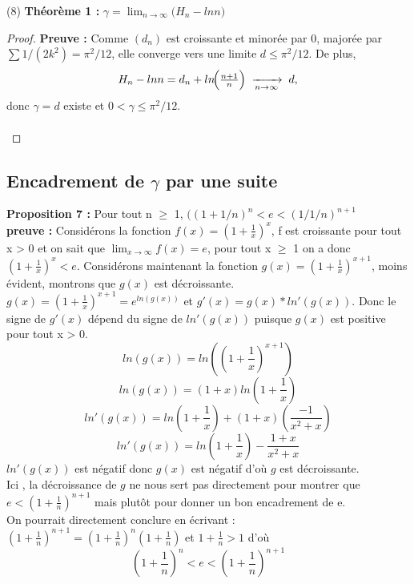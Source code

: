 \documentclass[a4paper,12pt]{article}
\begin{document}
(8) \textbf{Théorème 1 :} $\gamma = \lim_{n\to\infty}\bigl(H_n-ln n\bigr)$ \\

\begin{proof}
\textbf{Preuve : }
Comme \((d_n)\) est croissante et minorée par \(0\), majorée par \(\sum1/(2k^2)=\pi^2/12\), elle converge vers une limite \(d\le\pi^2/12\).  
De plus,
\[
H_n-ln n = d_n + ln\!\Bigl(\tfrac{n+1}{n}\Bigr)
\;\xrightarrow[n\to\infty]{}\;d,
\]
donc \(\gamma=d\) existe et \(0<\gamma\le\pi^2/12\). \\\\
\end{proof}



\color{black}

\subsection{Encadrement de \(\gamma\) par une suite}

\textbf{Proposition 7 : } Pour tout n $\ge$ 1, \(((1+1/n)^{n} < e < (1/1/n)^{n+1}\)\\

\textbf{preuve : }Considérons la fonction \(f(x) = (1+\frac{1}{x})^{x}\), f est croissante  pour tout x > 0 et on sait que \(\lim_{x \to \infty}f(x) = e\), pour tout x $\ge$ 1 on a donc \( (1+\frac{1}{x})^{x} < e\).
Considérons maintenant la fonction \(g(x) = (1 + \frac{1}{x})^{x+1}\), moins évident, montrons que \(g(x)\) est décroissante. 
\(g(x) = (1 + \frac{1}{x})^{x+1} = e^{ln(g(x))} \) et \(g'(x) = g(x) * ln'(g(x))\). Donc le signe de \(g'(x)\) dépend du signe de \(ln'(g(x))\) puisque \(g(x)\) est positive pour tout x > 0.
\[ ln(g(x)) = ln((1+\frac{1}{x})^{x+1})\]
\[ ln(g(x)) = (1+x)ln(1+\frac{1}{x})\]
\[ ln'(g(x)) = ln(1+\frac{1}{x}) + (1+x)(\frac{-1}{x^{2}+x})\]
\[ ln'(g(x)) = ln(1+\frac{1}{x}) - \frac{1+x}{x^{2}+x}\]
\(ln'(g(x))\) est négatif donc \(g(x)\) est négatif d'où \(g\) est décroissante.  \\
Ici , la décroissance de \(g\) ne nous sert pas directement pour montrer que \(e < (1 + \frac{1}{n})^{n+1}\) mais plutôt pour donner un bon encadrement de e.\\ 
On pourrait directement conclure en écrivant :\((1 + \frac{1}{n})^{n+1} = (1 + \frac{1}{n})^{n} (1 + \frac{1}{n}) \) et \(1+ \frac{1}{n} > 1 \) d'où \[(1 +\frac{1}{n})^{n} < e < (1 + \frac{1}{n})^{n+1}\] \\
\end{document}
